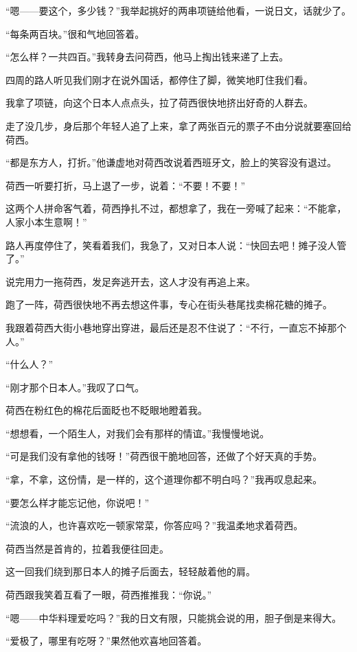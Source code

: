 \par “嗯——要这个，多少钱？”我举起挑好的两串项链给他看，一说日文，话就少了。
\par “每条两百块。”很和气地回答着。
\par “怎么样？一共四百。”我转身去问荷西，他马上掏出钱来递了上去。
\par 四周的路人听见我们刚才在说外国话，都停住了脚，微笑地盯住我们看。
\par 我拿了项链，向这个日本人点点头，拉了荷西很快地挤出好奇的人群去。
\par 走了没几步，身后那个年轻人追了上来，拿了两张百元的票子不由分说就要塞回给荷西。
\par “都是东方人，打折。”他谦虚地对荷西改说着西班牙文，脸上的笑容没有退过。
\par 荷西一听要打折，马上退了一步，说着：“不要！不要！”
\par 这两个人拼命客气着，荷西挣扎不过，都想拿了，我在一旁喊了起来：“不能拿，人家小本生意啊！”
\par 路人再度停住了，笑看着我们，我急了，又对日本人说：“快回去吧！摊子没人管了。”
\par 说完用力一拖荷西，发足奔逃开去，这人才没有再追上来。
\par 跑了一阵，荷西很快地不再去想这件事，专心在街头巷尾找卖棉花糖的摊子。
\par 我跟着荷西大街小巷地穿出穿进，最后还是忍不住说了：“不行，一直忘不掉那个人。”
\par “什么人？”
\par “刚才那个日本人。”我叹了口气。
\par 荷西在粉红色的棉花后面眨也不眨眼地瞪着我。
\par “想想看，一个陌生人，对我们会有那样的情谊。”我慢慢地说。
\par “可是我们没有拿他的钱呀！”荷西很干脆地回答，还做了个好天真的手势。
\par “拿，不拿，这份情，是一样的，这个道理你都不明白吗？”我再叹息起来。
\par “要怎么样才能忘记他，你说吧！”
\par “流浪的人，也许喜欢吃一顿家常菜，你答应吗？”我温柔地求着荷西。
\par 荷西当然是首肯的，拉着我便往回走。
\par 这一回我们绕到那日本人的摊子后面去，轻轻敲着他的肩。
\par 荷西跟我笑着互看了一眼，荷西推推我：“你说。”
\par “嗯——中华料理爱吃吗？”我的日文有限，只能挑会说的用，胆子倒是来得大。
\par “爱极了，哪里有吃呀？”果然他欢喜地回答着。
